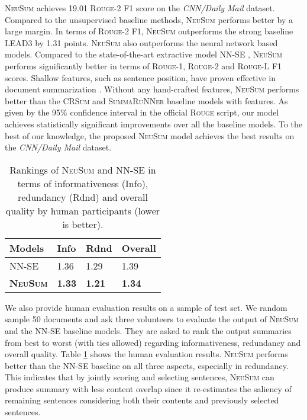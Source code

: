 \documentclass[11pt,a4paper]{article}
\newcommand{\ourModelName}{\textsc{NeuSum}}
\newcommand{\cnndm}{\textit{CNN/Daily Mail}}
\begin{document}
\ourModelName{} achieves 19.01 \textsc{Rouge}-2 F1 score on the \cnndm{} dataset.
Compared to the unsupervised baseline methods, \ourModelName{} performs better by a large margin.
In terms of \textsc{Rouge}-2 F1, \ourModelName{} outperforms the strong baseline \textsc{LEAD3} by 1.31 points.
\ourModelName{} also outperforms the neural network based models.
Compared to the state-of-the-art extractive model \textsc{NN-SE} \citep{cheng-lapata:2016:P16-1}, \ourModelName{} performs significantly better in terms of \textsc{Rouge}-1, \textsc{Rouge}-2 and \textsc{Rouge}-L F1 scores.
Shallow features, such as sentence position, have proven effective in document summarization \citep{Ren:2017:LCS:3077136.3080792,nallapati2017summarunner}.
Without any hand-crafted features, \ourModelName{} performs better than the \textsc{CRSum} and \textsc{SummaRuNNer} baseline models with features.
As given by the 95\% confidence interval in the official \textsc{Rouge} script,
our model achieves statistically significant improvements over all the baseline models.
To the best of our knowledge, the proposed \ourModelName{} model achieves the best results on the \cnndm{} dataset.



\begin{table}[h]
	\begin{center}
		\begin{tabular}{llll}
			\toprule
			\bf Models & Info & Rdnd & Overall \\ 
			\midrule
			\textsc{NN-SE}    & 1.36  &  1.29  & 1.39   \\
			\hline
			\textbf{\ourModelName{}}  & \textbf{1.33} & \textbf{1.21}  &  \textbf{1.34} \\
			\bottomrule
		\end{tabular}
	\end{center}
	\caption{\label{table:human}
	Rankings of \ourModelName{} and \textsc{NN-SE} in terms of informativeness (Info), redundancy (Rdnd) and overall quality by human participants  (lower is better).	 }
\end{table}

We also provide human evaluation results on a sample of test set.
We random sample 50 documents and ask three volunteers to evaluate the output of \ourModelName{} and the \textsc{NN-SE} baseline models.
They are asked to rank the output summaries from best to worst (with ties allowed) regarding  informativeness, redundancy and overall quality.
Table \ref{table:human} shows the human evaluation results.
\ourModelName{} performs better than the \textsc{NN-SE} baseline on all three aspects, especially in redundancy.
This indicates that by jointly scoring and selecting sentences, \ourModelName{} can produce summary with less content overlap since it re-estimates the saliency of remaining sentences considering both their contents and previously selected sentences.
\end{document}
